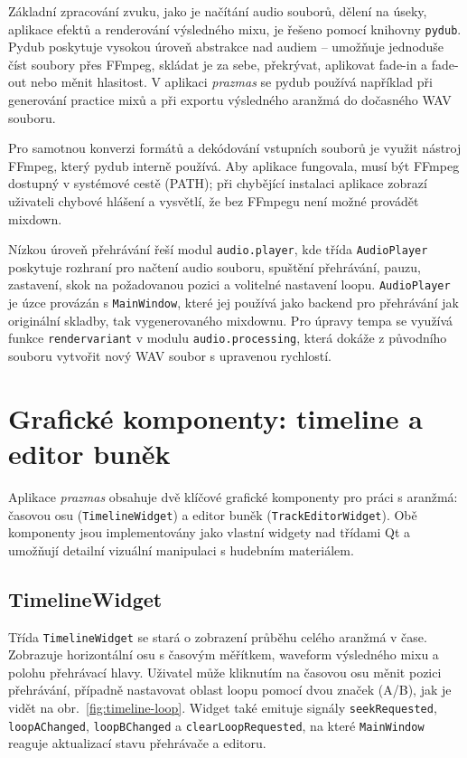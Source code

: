\documentclass[12pt, a4paper,
]{report}
\begin{document}
Základní zpracování zvuku, jako je načítání audio souborů, dělení na úseky, aplikace efektů a renderování výsledného mixu, je řešeno pomocí knihovny \texttt{pydub}. Pydub poskytuje vysokou úroveň abstrakce nad audiem – umožňuje jednoduše číst soubory přes FFmpeg, skládat je za sebe, překrývat, aplikovat fade-in a fade-out nebo měnit hlasitost. V aplikaci \textit{prazmas} se pydub používá například při generování practice mixů a při exportu výsledného aranžmá do dočasného WAV souboru.

Pro samotnou konverzi formátů a dekódování vstupních souborů je využit nástroj FFmpeg, který pydub interně používá. Aby aplikace fungovala, musí být FFmpeg dostupný v systémové cestě (PATH); při chybějící instalaci aplikace zobrazí uživateli chybové hlášení a vysvětlí, že bez FFmpegu není možné provádět mixdown.

Nízkou úroveň přehrávání řeší modul \texttt{audio.player}, kde třída \texttt{AudioPlayer} poskytuje rozhraní pro načtení audio souboru, spuštění přehrávání, pauzu, zastavení, skok na požadovanou pozici a volitelné nastavení loopu. \texttt{AudioPlayer} je úzce provázán s \texttt{MainWindow}, které jej používá jako backend pro přehrávání jak originální skladby, tak vygenerovaného mixdownu. Pro úpravy tempa se využívá funkce \texttt{rendervariant} v modulu \texttt{audio.processing}, která dokáže z původního souboru vytvořit nový WAV soubor s upravenou rychlostí.

\section{Grafické komponenty: timeline a editor buněk}

Aplikace \textit{prazmas} obsahuje dvě klíčové grafické komponenty pro práci s aranžmá: časovou osu (\texttt{TimelineWidget}) a editor buněk (\texttt{TrackEditorWidget}). Obě komponenty jsou implementovány jako vlastní widgety nad třídami Qt a umožňují detailní vizuální manipulaci s hudebním materiálem.

\subsection{TimelineWidget}

Třída \texttt{TimelineWidget} se stará o zobrazení průběhu celého aranžmá v čase. 
Zobrazuje horizontální osu s časovým měřítkem, waveform výsledného mixu a polohu přehrávací hlavy. 
Uživatel může kliknutím na časovou osu měnit pozici přehrávání, 
případně nastavovat oblast loopu pomocí dvou značek (A/B), jak je vidět na obr.~\ref{fig:timeline-loop}. 
Widget také emituje signály \texttt{seekRequested}, \texttt{loopAChanged}, \texttt{loopBChanged} 
a \texttt{clearLoopRequested}, na které \texttt{MainWindow} reaguje aktualizací stavu přehrávače a editoru.
\end{document}
